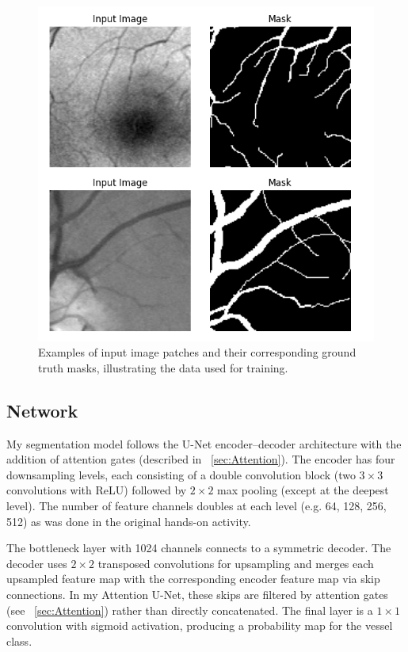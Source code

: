 \documentclass[11pt]{article}
\begin{document}
\begin{figure}[h!]
    \centering
    \includegraphics[scale=0.5]{figure_patch_examples.png}
    \caption{Examples of input image patches and their corresponding ground truth masks, illustrating the data used for training.}
    \label{fig:patch_examples}
\end{figure}


\subsection{Network}
\label{sec:Network}

My segmentation model follows the U-Net encoder–decoder architecture with the addition of attention gates (described in ~\ref{sec:Attention}). The encoder has four downsampling levels, each consisting of a double convolution block (two $3\times3$ convolutions with ReLU) followed by $2\times2$ max pooling (except at the deepest level). The number of feature channels doubles at each level (e.g. 64, 128, 256, 512) as was done in the original hands-on activity. 

The bottleneck layer with 1024 channels connects to a symmetric decoder. The decoder uses $2\times2$ transposed convolutions for upsampling and merges each upsampled feature map with the corresponding encoder feature map via skip connections. In my Attention U-Net, these skips are filtered by attention gates (see ~\ref{sec:Attention}) rather than directly concatenated. The final layer is a $1\times1$ convolution with sigmoid activation, producing a probability map for the vessel class.
\end{document}
